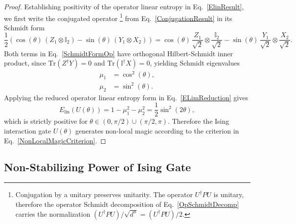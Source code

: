 \documentclass[12pt,a4paper]{article}
\begin{document}
\begin{proof}
Establishing positivity of the operator linear entropy in Eq.\ \eqref{ElinResult}, we first write the conjugated operator%
%
\footnote{Conjugation by a unitary preserves unitarity. The operator $U^\dagger P U$ is unitary, therefore the operator Schmidt decomposition of Eq.\ \eqref{OpSchmidtDecomp} carries the normalization $(U^\dagger P U)/\sqrt{d^n} = (U^\dagger P U)/2$.} %
%
from Eq.\ \eqref{ConjugationResult} in its Schmidt form
%
\begin{equation}\label{SchmidtFormOp}
\frac{1}{2}\left(\cos(\theta)\,(Z_1\otimes\mathbb{I}_2) - \sin(\theta)\,(Y_1\otimes X_2)\right) = \cos(\theta)\,\frac{Z_1}{\sqrt{2}}\otimes\frac{\mathbb{I}_2}{\sqrt{2}} - \sin(\theta)\,\frac{Y_1}{\sqrt{2}}\otimes\frac{X_2}{\sqrt{2}}.
\end{equation}
%
Both terms in Eq.\ \eqref{SchmidtFormOp} have orthogonal Hilbert-Schmidt inner product, since $\mathrm{Tr}(Z^\dagger Y) = 0$ and $\mathrm{Tr}(\mathbb{I}^\dagger X) = 0$, yielding Schmidt eigenvalues 
%
\begin{equation}
\begin{split}
    \mu_1 &= \cos^2(\theta),\\
    \mu_2 &= \sin^2(\theta).
\end{split}
\end{equation}
%
Applying the reduced operator linear entropy form in Eq.\ \eqref{ELimReduction} gives
%
\begin{equation}
E_{\mathrm{lin}}(U(\theta)) = 1 - \mu_1^2 - \mu_2^2 = \frac{1}{2}\sin^2(2\theta),
\end{equation}
%
which is strictly positive for $\theta\in(0,\pi/2)\cup(\pi/2,\pi)$. Therefore the Ising interaction gate $U(\theta)$ generates non-local magic according to the criterion in Eq.\ \eqref{NonLocalMagicCriterion}.
\end{proof}

\subsection{Non-Stabilizing Power of Ising Gate}\label{subsec:nsp}
\end{document}
